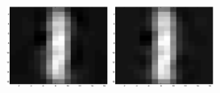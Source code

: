 \documentclass{article}
\begin{document}
\includegraphics[width=0.25\textwidth]{H_tes7.eps}\hspace{0.03\textwidth}%
\includegraphics[width=0.25\textwidth]{H_tes8.eps}\\[1em]
\end{document}

